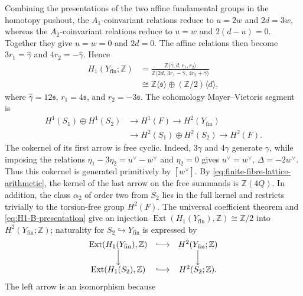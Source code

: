 \documentclass[11pt]{article}
\theoremstyle{definition}
\theoremstyle{remark}
\numberwithin{equation}{section}
\begin{document}
Combining the presentations of the two affine fundamental groups in the
homotopy pushout, the $A_1$-coinvariant relations reduce to
$u=2w$ and $2d=3w$, whereas the $A_2$-coinvariant relations reduce to
$u=w$ and $2(d-u)=0$.  Together they give $u=w=0$ and $2d=0$.
The affine relations then become
$3r_1=\widehat\gamma$ and $4r_2=-\widehat\gamma$.  Hence
\begin{equation}\label{eq:H1-B-presentation}
 \begin{split}
 H_1(Y_{\mathrm{fin}};\mathbb Z)
 &=\frac{\mathbb Z\langle\widehat\gamma,d,r_1,r_2\rangle}
 {\mathbb Z\langle2d,\,3r_1-\widehat\gamma,\,
 4r_2+\widehat\gamma\rangle}\\
 &\cong\mathbb Z\langle\mathfrak s\rangle
   \oplus(\mathbb Z/2)\langle d\rangle,
 \end{split}
\end{equation}
where $\widehat\gamma=12\mathfrak s$, $r_1=4\mathfrak s$, and
$r_2=-3\mathfrak s$.  The cohomology
Mayer--Vietoris segment is
\[
 \begin{split}
 H^1(S_1)\oplus H^1(S_2)&\longrightarrow H^1(F)
 \longrightarrow H^2(Y_{\mathrm{fin}})\\
 &\longrightarrow H^2(S_1)\oplus H^2(S_2)
 \longrightarrow H^2(F).
 \end{split}
\]
The cokernel of its first arrow is free cyclic.  Indeed,
$3\gamma$ and $4\gamma$ generate $\gamma$, while
imposing the relations $\eta_1-3\eta_2=u^\vee-w^\vee$ and $\eta_2=0$ gives
$u^\vee=w^\vee$, $\Delta=-2w^\vee$.  Thus this cokernel is generated primitively by
$[w^\vee]$.  By \eqref{eq:finite-fibre-lattice-arithmetic}, the kernel of
the last arrow on the free summands is $\mathbb Z(4Q)$.  In addition, the
class $\alpha_2$ of order two from $S_2$ lies in the full kernel and
restricts trivially
to the torsion-free group $H^2(F)$.  The universal coefficient theorem and
\eqref{eq:H1-B-presentation} give an injection
$\operatorname{Ext}(H_1(Y_{\mathrm{fin}}),\mathbb Z)\cong\mathbb Z/2$
into $H^2(Y_{\mathrm{fin}};\mathbb Z)$; naturality for
$S_2\hookrightarrow Y_{\mathrm{fin}}$ is expressed by
\[
 \begin{array}{ccc}
 \operatorname{Ext}(H_1(Y_{\mathrm{fin}}),\mathbb Z)
   &\lhook\joinrel\longrightarrow&H^2(Y_{\mathrm{fin}};\mathbb Z)\\
 \Big\downarrow&&\Big\downarrow\\
 \operatorname{Ext}(H_1(S_2),\mathbb Z)
   &\lhook\joinrel\longrightarrow&H^2(S_2;\mathbb Z).
 \end{array}
\]
The left arrow is an isomorphism because
\end{document}

